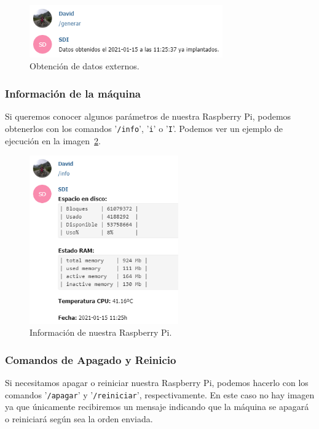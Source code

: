 \begin{figure}[h]
\centering
\includegraphics[width=0.74\textwidth]{img/SalidasBot/generar.PNG}
\caption{Obtención de datos externos.}\label{Bot:generar}
\end{figure}
\subsubsection{Información de la máquina}
Si queremos conocer algunos parámetros de nuestra Raspberry Pi, podemos obtenerlos con los comandos '\texttt{/info}', '\texttt{i}' o '\texttt{I}'. Podemos ver un ejemplo de ejecución en la imagen~\ref{Bot:infoRbP}.

\begin{figure}[!h]
\centering
\includegraphics[width=0.57\textwidth]{img/SalidasBot/infoRbP.PNG}
\caption{Información de nuestra Raspberry Pi.}\label{Bot:infoRbP}
\end{figure}

\subsubsection{Comandos de Apagado y Reinicio}
Si necesitamos apagar o reiniciar nuestra Raspberry Pi, podemos hacerlo con los comandos '\texttt{/apagar}' y '\texttt{/reiniciar}', respectivamente. En este caso no hay imagen ya que únicamente recibiremos un mensaje indicando que la máquina se apagará o reiniciará según sea la orden enviada.
